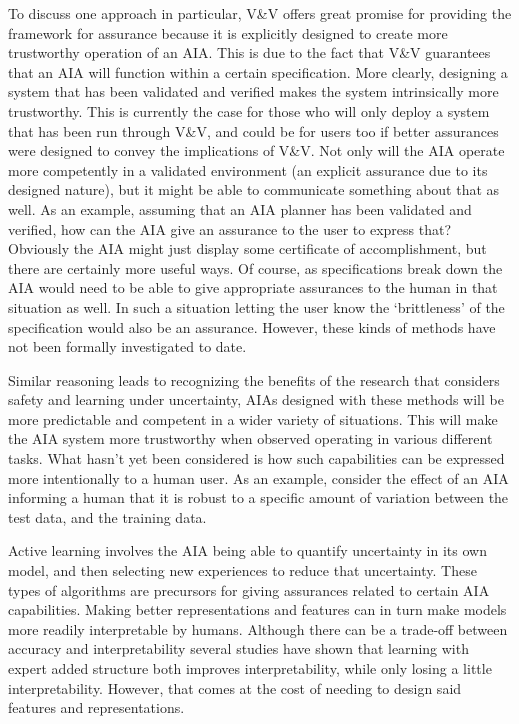     To discuss one approach in particular, V\&V offers great promise for providing the framework for assurance because it is explicitly designed to create more trustworthy operation of an AIA. This is due to the fact that V\&V guarantees that an AIA will function within a certain specification. More clearly, designing a system that has been validated and verified makes the system intrinsically more trustworthy. This is currently the case for those who will only deploy a system that has been run through V\&V, and could be for users too if better assurances were designed to convey the implications of V\&V. Not only will the AIA operate more competently in a validated environment (an explicit assurance due to its designed nature), but it might be able to communicate something about that as well. As an example, assuming that an AIA planner has been validated and verified, how can the AIA give an assurance to the user to express that? Obviously the AIA might just display some certificate of accomplishment, but there are certainly more useful ways. Of course, as specifications break down the AIA would need to be able to give appropriate assurances to the human in that situation as well. In such a situation letting the user know the `brittleness' of the specification would also be an assurance. However, these kinds of methods have not been formally investigated to date.
    
    Similar reasoning leads to recognizing the benefits of the research that considers safety and learning under uncertainty, AIAs designed with these methods will be more predictable and competent in a wider variety of situations. This will make the AIA system more trustworthy when observed operating in various different tasks. What hasn't yet been considered is how such capabilities can be expressed more intentionally to a human user. As an example, consider the effect of an AIA informing a human that it is robust to a specific amount of variation between the test data, and the training data.

    Active learning involves the AIA being able to quantify uncertainty in its own model, and then selecting new experiences to reduce that uncertainty. These types of algorithms are precursors for giving assurances related to certain AIA capabilities. Making better representations and features can in turn make models more readily interpretable by humans. Although there can be a trade-off between accuracy and interpretability several studies have shown that learning with expert added structure both improves interpretability, while only losing a little interpretability. However, that comes at the cost of needing to design said features and representations.

